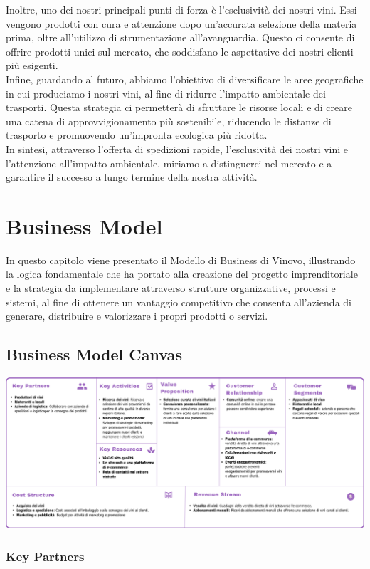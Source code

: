 \documentclass[12pt, a4paper]{article}
\newcommand{\meskip}{\medskip \\}
\newcommand{\bskip}{\bigskip \\}
\begin{document}
Inoltre, uno dei nostri principali punti di forza è l'esclusività dei nostri vini. Essi vengono prodotti con cura e attenzione dopo un'accurata selezione della materia prima, oltre all'utilizzo di strumentazione all'avanguardia. Questo ci consente di offrire prodotti unici sul mercato, che soddisfano le aspettative dei nostri clienti più esigenti.\meskip
Infine, guardando al futuro, abbiamo l'obiettivo di diversificare le aree geografiche in cui produciamo i nostri vini, al fine di ridurre l'impatto ambientale dei trasporti. Questa strategia ci permetterà di sfruttare le risorse locali e di creare una catena di approvvigionamento più sostenibile, riducendo le distanze di trasporto e promuovendo un'impronta ecologica più ridotta.\bskip
In sintesi, attraverso l'offerta di spedizioni rapide, l'esclusività dei nostri vini e l'attenzione all'impatto ambientale, miriamo a distinguerci nel mercato e a garantire il successo a lungo termine della nostra attività.

\section{Business Model}
In questo capitolo viene presentato il Modello di Business di Vinovo, illustrando la logica fondamentale che ha portato alla creazione del progetto imprenditoriale e la strategia da implementare attraverso strutture organizzative, processi e sistemi, al fine di ottenere un vantaggio competitivo che consenta all'azienda di generare, distribuire e valorizzare i propri prodotti o servizi.

\subsection{Business Model Canvas}
\includegraphics[width=\textwidth]{images/business_model_canvas.png}

\subsubsection{Key Partners}
\end{document}
